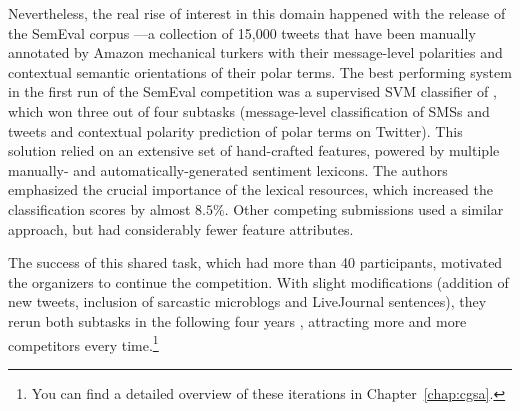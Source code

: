 
Nevertheless, the real rise of interest in this domain happened with
the release of the Sem\-Eval corpus \cite{Nakov:13}---a collection of
15,000 tweets that have been manually annotated by Amazon mechanical
turkers with their message-level polarities and contextual semantic
orientations of their polar terms. The best performing system in the
first run of the SemEval competition was a supervised SVM classifier
of \citet{Mohammad:13}, which won three out of four subtasks
(message-level classification of SMSs and tweets and contextual
polarity prediction of polar terms on Twitter).  This solution relied
on an extensive set of hand-crafted features, powered by multiple
manually- and automatically-generated sentiment lexicons.  The authors
emphasized the crucial importance of the lexical resources, which
increased the classification scores by almost $8.5\%$.  Other
competing submissions \cite{Becker:13,Guenther:13,Kokciyan:13} used a
similar approach, but had considerably fewer feature attributes.

The success of this shared task, which had more than 40 participants,
motivated the organizers to continue the competition.  With slight
modifications (addition of new tweets, inclusion of sarcastic
microblogs and LiveJournal sentences), they rerun both subtasks in the
following four years
\cite{Rosenthal:14,Rosenthal:15,Nakov:16,Rosenthal:17}, attracting
more and more competitors every time.\footnote{You can find a detailed
  overview of these iterations in Chapter~\ref{chap:cgsa}.}


